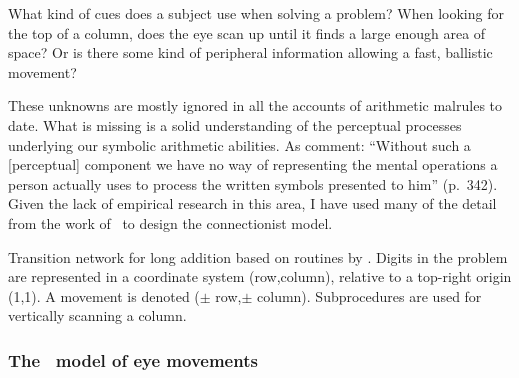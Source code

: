  What kind of cues does a subject use
when solving a problem?  When looking for the top of a column, does the eye
scan up until it finds a large enough area of space? Or is there some kind
of peripheral information allowing a fast, ballistic movement?


These unknowns are mostly ignored in all the accounts of arithmetic
malrules to date.  What is missing is a solid understanding of the
perceptual processes underlying our symbolic arithmetic abilities. As
 comment: ``Without such a [perceptual] component we have
no way of representing the mental operations a person actually uses to
process the written symbols presented to him'' (p.~342).  Given the lack of
empirical research in this area, I have used many of the detail from the
work of \citeauthor{suppproc}\ to design the connectionist model.


\begin{fancyfigure}
\centerline{}
\caption{Transition network for long addition based on routines by
\protect{}.  Digits in the problem are represented in a
coordinate system (row,column), relative to a top-right origin (1,1).
A movement is denoted ($\pm$ row,$\pm$ column).
Subprocedures are used for
vertically scanning a column.}
\label{f:addtrans}
\end{fancyfigure}


\subsubsection{The \protect\citeauthor{suppproc}\ model of eye movements}


